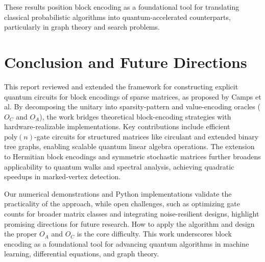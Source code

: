\documentclass{article}
\begin{document}
    These results position block encoding as a foundational tool for translating classical probabilistic algorithms into quantum-accelerated counterparts, particularly in graph theory and search problems.

    \section{Conclusion and Future Directions}
    
    This report reviewed and extended the framework for constructing explicit quantum circuits for block encodings of sparse matrices, as proposed by Camps et al. By decomposing the unitary into sparsity-pattern and value-encoding oracles ($O_C$ and $O_A$), the work bridges theoretical block-encoding strategies with hardware-realizable implementations. Key contributions include efficient $\mathrm{poly}(n)$-gate circuits for structured matrices like circulant and extended binary tree graphs, enabling scalable quantum linear algebra operations. The extension to Hermitian block encodings and symmetric stochastic matrices further broadens applicability to quantum walks and spectral analysis, achieving quadratic speedups in marked-vertex detection.
    
    Our numerical demonstrations and Python implementations validate the practicality of the approach, while open challenges, such as optimizing gate counts for broader matrix classes and integrating noise-resilient designs, highlight promising directions for future research. How to apply the algorithm and design the proper $O_A$ and $O_C$ is the core difficulty. This work underscores block encoding as a foundational tool for advancing quantum algorithms in machine learning, differential equations, and graph theory.

    
    
\end{document}
